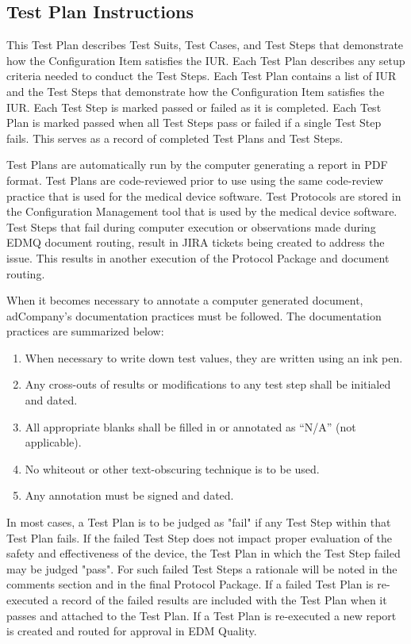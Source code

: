 \subsection{Test Plan Instructions}
This Test Plan describes Test Suits, Test Cases, and Test Steps that demonstrate
how the Configuration Item satisfies the IUR.  Each Test Plan describes any
setup criteria needed to conduct the Test Steps. Each Test Plan contains a list
of IUR and the Test Steps that demonstrate how the Configuration Item satisfies
the IUR. Each Test Step is marked passed or failed as it is completed.  Each
Test Plan is marked passed when all Test Steps pass or failed if a single Test
Step fails.  This serves as a record of completed Test Plans and Test Steps.

Test Plans are automatically run by the computer generating a report in PDF
format.  Test Plans are code-reviewed prior to use using the same code-review
practice that is used for the medical device software.  Test Protocols are
stored in the Configuration Management tool that is used by the medical device
software.  Test Steps that fail during computer execution or observations made
during EDMQ document routing, result in JIRA tickets being created to address
the issue.  This results in another execution of the Protocol Package and
document routing.

When it becomes necessary to annotate a computer generated document, adCompany's
documentation practices must be followed.  The documentation practices are
summarized below:

\begin{enumerate}
\item When necessary to write down test values, they are written using
an ink pen.
\item Any cross-outs of results or modifications to any test step shall be initialed and dated.
\item All appropriate blanks shall be filled in or annotated as ``N/A'' (not applicable).
\item No whiteout or other text-obscuring technique is to be used.
\item Any annotation must be signed and dated.
\end{enumerate}

In most cases, a Test Plan is to be judged as "fail" if any Test Step within
that Test Plan fails. If the failed Test Step does not impact proper
evaluation of the safety and effectiveness of the device, the Test Plan in
which the Test Step failed may be judged "pass".  For such failed Test Steps a
rationale will be noted in the comments section and in the final Protocol
Package.  If a failed Test Plan is re-executed a record of the failed
results are included with the Test Plan when it passes and attached to the
Test Plan.  If a Test Plan is re-executed a new report is
created and routed for approval in EDM Quality.

